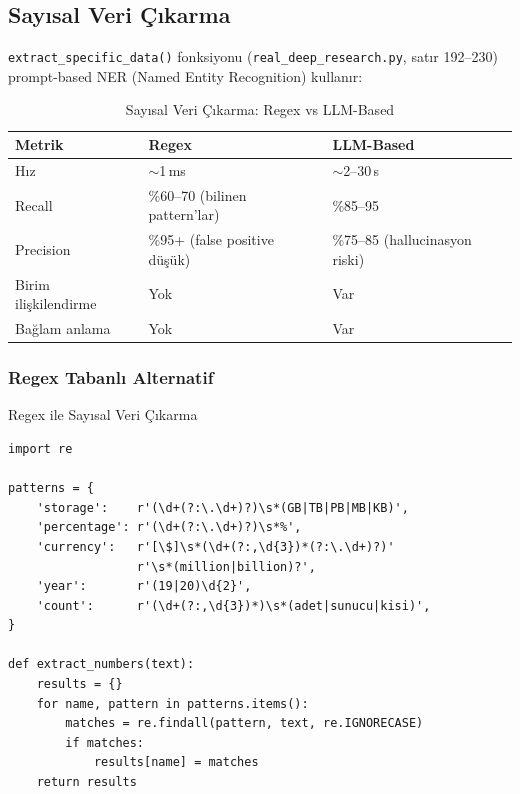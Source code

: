 \subsection{Say{\i}sal Veri \c{C}{\i}karma}

\texttt{extract\_specific\_data()} fonksiyonu (\texttt{real\_deep\_research.py}, sat{\i}r 192--230) prompt-based NER (Named Entity Recognition) kullan{\i}r:

\begin{table}[H]
\centering
\caption{Say{\i}sal Veri \c{C}{\i}karma: Regex vs LLM-Based}
\label{tab:ner-comparison}
\begin{tabularx}{\textwidth}{lXX}
\toprule
\color{chapterBlue}\textbf{Metrik} & \color{chapterBlue}\textbf{Regex} & \color{chapterBlue}\textbf{LLM-Based} \\
\midrule
H{\i}z         & $\sim$1\,ms                                 & $\sim$2--30\,s \\
Recall       & \%60--70 (bilinen pattern'lar)               & \%85--95 \\
Precision    & \%95+ (false positive d\"{u}\c{s}\"{u}k)                & \%75--85 (hallucinasyon riski) \\
Birim ili\c{s}kilendirme & Yok                             & Var \\
Ba\u{g}lam anlama & Yok                                    & Var \\
\bottomrule
\end{tabularx}
\end{table}

\subsubsection{Regex Tabanl{\i} Alternatif}

\begin{kodref}{Regex ile Say{\i}sal Veri \c{C}{\i}karma}
\begin{lstlisting}
import re

patterns = {
    'storage':    r'(\d+(?:\.\d+)?)\s*(GB|TB|PB|MB|KB)',
    'percentage': r'(\d+(?:\.\d+)?)\s*%',
    'currency':   r'[\$]\s*(\d+(?:,\d{3})*(?:\.\d+)?)'
                  r'\s*(million|billion)?',
    'year':       r'(19|20)\d{2}',
    'count':      r'(\d+(?:,\d{3})*)\s*(adet|sunucu|kisi)',
}

def extract_numbers(text):
    results = {}
    for name, pattern in patterns.items():
        matches = re.findall(pattern, text, re.IGNORECASE)
        if matches:
            results[name] = matches
    return results
\end{lstlisting}
\end{kodref}

